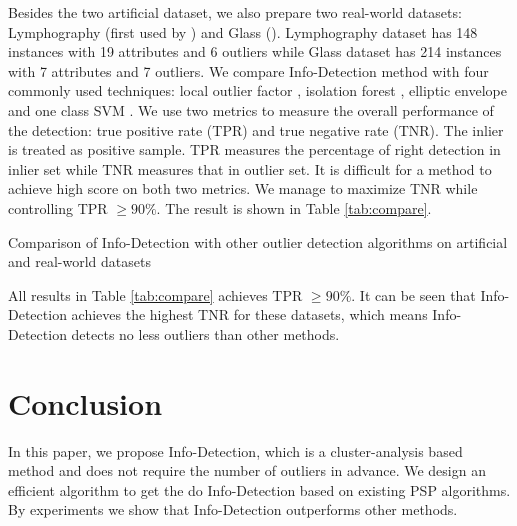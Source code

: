 \documentclass[runningheads]{llncs}
\begin{document}
Besides the two artificial dataset, we also prepare two real-world datasets: Lymphography (first used by \cite{Lazarevic}) and Glass (\cite{hics}). Lymphography dataset has 148 instances with 19 attributes and 6 outliers while Glass dataset has 214 instances with 7 attributes and 7 outliers. We compare Info-Detection method with four commonly used techniques: local outlier factor \cite{Breunig}, isolation forest \cite{if}, elliptic envelope \cite{rousseeuw1999fast} and one class SVM \cite{svm}. We use two metrics to measure the overall performance of the detection: true positive rate (TPR) and true negative rate (TNR). The inlier is treated as positive sample. TPR measures the percentage of right detection in inlier set while TNR measures that in outlier set. It is difficult for a method to achieve high score on both two metrics. We manage to maximize TNR while controlling TPR $\geq 90\%$. The result is shown in Table \ref{tab:compare}.
\begin{table}[!ht]
\centering
{}
\caption{Comparison of Info-Detection with other outlier detection algorithms on artificial and real-world datasets}\label{tab:compare}
\end{table}

All results in Table \ref{tab:compare} achieves TPR $\geq 90\%$. It can be seen that Info-Detection achieves the highest TNR for these datasets, which means Info-Detection detects no less outliers than other methods.

\section{Conclusion}\label{sec:Conclusion}
In this paper, we propose Info-Detection, which is a cluster-analysis based method and does not require the number of outliers in advance. We design an efficient algorithm to get the do Info-Detection based on existing PSP algorithms. By experiments we show that Info-Detection outperforms other methods.  
%
%
%


%
\end{document}

